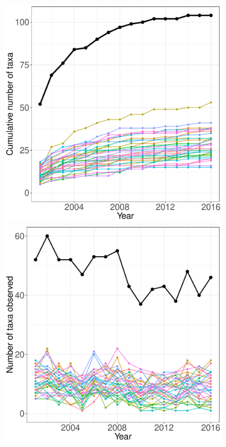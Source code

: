 \documentclass[11pt, oneside]{article}
\begin{document}
\begin{figure}[h!]
\centering
\includegraphics[scale = 0.4]{cap-birds-banville_species_accumulation_curve.pdf}
\includegraphics[scale = 0.4]{cap-birds-banville_num_taxa_over_time.pdf}

\end{figure}
\end{document}
